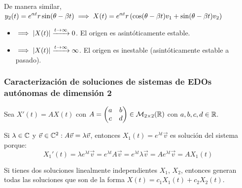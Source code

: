 De manera similar, $\displaystyle y_2(t) = e^{\alpha t} r \sin(\theta - \beta t) \implies X(t) = e^{\alpha t} r \left(\cos(\theta - \beta t) v_1 + \sin(\theta - \beta t) v_2\right)$
\begin{itemize}
	\item {} $\implies \left|X(t)\right| \xrightarrow{t\to\infty} 0$. El origen es asintóticamente estable.
	\item {} $\implies \left|X(t)\right| \xrightarrow{t\to\infty} \infty$. El origen es inestable (asintóticamente estable a pasado).
\end{itemize}



\subsubsection{Caracterización de soluciones de sistemas de EDOs autónomas de dimensión 2}

Sea $X'(t) = A X(t)$ con $A =\begin{pmatrix}
		a & b \\
		c & d
	\end{pmatrix} \in \mathcal{M}_{2\times 2}(\mathbb{R})$ con $a,b,c,d \in \mathbb{R}$.

Si $\lambda \in \mathbb{C}$ y $\vec{v} \in \mathbb{C}^2 : A\vec{v} = \lambda \vec{v}$, entonces $X_1(t) = e^{\lambda t} \vec{v}$ es solución del sistema porque:
\[X_1'(t) = \lambda e^{\lambda t} \vec{v} = e^{\lambda t} A\vec{v} = e^{\lambda t} \lambda \vec{v} = A e^{\lambda t} \vec{v} = A X_1(t)\]

Si tienes dos soluciones linealmente independientes $X_1$, $X_2$, entonces generan todas las soluciones que son de la forma $X(t) = c_1 X_1(t) + c_2 X_2(t)$.

